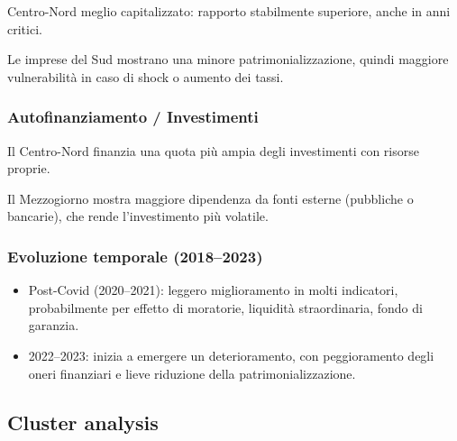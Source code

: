 \documentclass[
  letterpaper,
  DIV=11,
  numbers=noendperiod]{scrartcl}
\providecommand{\tightlist}{%
  \setlength{\itemsep}{0pt}\setlength{\parskip}{0pt}}
\begin{document}
Centro-Nord meglio capitalizzato: rapporto stabilmente superiore, anche
in anni critici.

Le imprese del Sud mostrano una minore patrimonializzazione, quindi
maggiore vulnerabilità in caso di shock o aumento dei tassi.

\subsubsection{Autofinanziamento /
Investimenti}\label{autofinanziamento-investimenti}

Il Centro-Nord finanzia una quota più ampia degli investimenti con
risorse proprie.

Il Mezzogiorno mostra maggiore dipendenza da fonti esterne (pubbliche o
bancarie), che rende l'investimento più volatile.

\subsubsection{Evoluzione temporale
(2018--2023)}\label{evoluzione-temporale-20182023}

\begin{itemize}
\tightlist
\item
  Post-Covid (2020--2021): leggero miglioramento in molti indicatori,
  probabilmente per effetto di moratorie, liquidità straordinaria, fondo
  di garanzia.
\item
  2022--2023: inizia a emergere un deterioramento, con peggioramento
  degli oneri finanziari e lieve riduzione della patrimonializzazione.
\end{itemize}

\subsection{Cluster analysis}\label{cluster-analysis}
\end{document}
